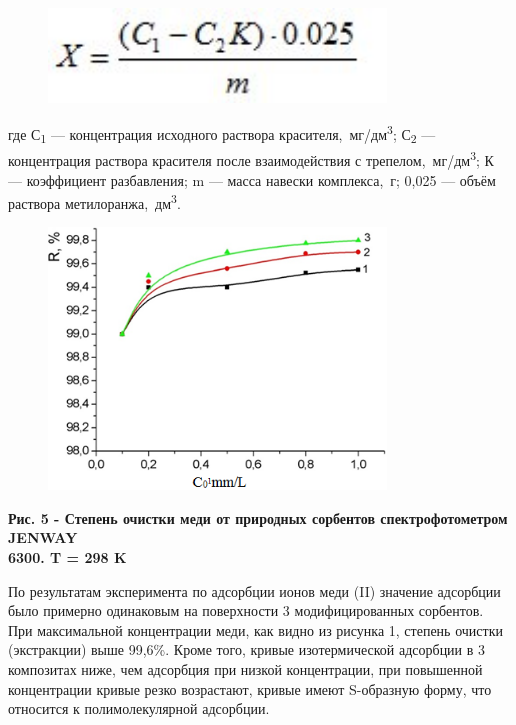 \begin{figure}[H]
	\centering
	\includegraphics[width=0.8\textwidth]{media/chem/image5}
	\caption*{}
\end{figure}


где С\textsubscript{1} --- концентрация исходного раствора
красителя,~мг/дм\textsuperscript{3}; С\textsubscript{2} --- концентрация
раствора красителя после взаимодействия с
трепелом,~мг/дм\textsuperscript{3}; К --- коэффициент разбавления; m ---
масса навески комплекса,~г; 0,025 --- объём раствора
метилоранжа,~дм\textsuperscript{3}.

\begin{figure}[H]
	\centering
	\includegraphics[width=0.8\textwidth]{media/chem/image6}
	\caption*{}
\end{figure}


{\bfseries Рис. 5 - Степень очистки меди от природных сорбентов
спектрофотометром JENWAY\\
6300. T = 298 K}

По результатам эксперимента по адсорбции ионов меди (II) значение
адсорбции было примерно одинаковым на поверхности 3 модифицированных
сорбентов. При максимальной концентрации меди, как видно из рисунка 1,
степень очистки (экстракции) выше 99,6\%. Кроме того, кривые
изотермической адсорбции в 3 композитах ниже, чем адсорбция при низкой
концентрации, при повышенной концентрации кривые резко возрастают,
кривые имеют S-образную форму, что относится к полимолекулярной
адсорбции.

